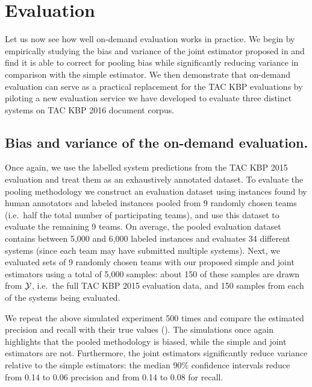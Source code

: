 
\section{Evaluation}
\label{sec:evaluation}

Let us now see how well on-demand evaluation works in practice.
We begin by empirically studying the bias and variance of the joint estimator proposed in  and find it is able to correct for pooling bias while significantly reducing variance in comparison with the simple estimator.
We then demonstrate that on-demand evaluation can serve as a practical replacement for the TAC KBP evaluations by piloting a new evaluation service we have developed to evaluate three distinct systems on TAC KBP 2016 document corpus.

\subsection{Bias and variance of the on-demand evaluation.}
Once again, we use the labelled system predictions from the TAC KBP 2015 evaluation and treat them as an exhaustively annotated dataset.
To evaluate the pooling methodology we construct an evaluation dataset using
instances found by human annotators and labeled instances pooled from 9
randomly chosen teams (i.e.\ half the total number of participating teams), and
use this dataset to evaluate the remaining 9 teams.
On average, the pooled evaluation dataset contains between 5,000 and 6,000 labeled instances and evaluates 34 different systems (since each team may have submitted multiple systems).
Next, we evaluated sets of 9 randomly chosen teams with our proposed simple and joint estimators using a total of 5,000 samples:
about 150 of these samples are drawn from $\mathcal{Y}$, i.e.\ the full TAC KBP 2015 evaluation data, and 150 samples from each of the systems being evaluated.

We repeat the above simulated experiment 500 times and compare the estimated precision and recall with their true values ().
The simulations once again highlights that the pooled methodology is biased, while the simple and joint estimators are not.
Furthermore, the joint estimators significantly reduce variance relative to the simple estimators:
the median 90\% confidence intervals reduce from 0.14 to 0.06 precision and from 0.14 to 0.08 for recall.

